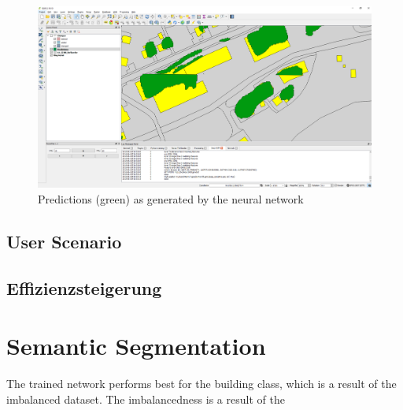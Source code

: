 \begin{figure}[H]
    \centering
	\includegraphics[width=0.8\linewidth]{chapters/practical_results/images/qgis_predictions.png}
	\caption{Predictions (green) as generated by the neural network}
	\label{fig:plugin:predictions}
\end{figure}

\subsection{User Scenario}

\subsection{Effizienzsteigerung}

\section{Semantic Segmentation}
The trained network performs best for the building class, which is a result of the imbalanced dataset. The imbalancedness is a result of the 